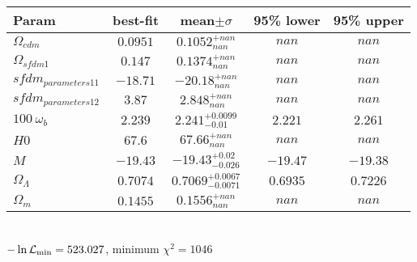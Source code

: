 \begin{tabular}{|l|c|c|c|c|} 
 \hline 
Param & best-fit & mean$\pm\sigma$ & 95\% lower & 95\% upper \\ \hline 
$\Omega_{cdm }$ &$0.0951$ & $0.1052_{nan}^{+nan}$ & $nan$ & $nan$ \\ 
$\Omega_{sfdm 1 }$ &$0.147$ & $0.1374_{nan}^{+nan}$ & $nan$ & $nan$ \\ 
$sfdm_{parameters 1  1 }$ &$-18.71$ & $-20.18_{nan}^{+nan}$ & $nan$ & $nan$ \\ 
$sfdm_{parameters 1  2 }$ &$3.87$ & $2.848_{nan}^{+nan}$ & $nan$ & $nan$ \\ 
$100~\omega_{b }$ &$2.239$ & $2.241_{-0.01}^{+0.0099}$ & $2.221$ & $2.261$ \\ 
$H0$ &$67.6$ & $67.66_{nan}^{+nan}$ & $nan$ & $nan$ \\ 
$M$ &$-19.43$ & $-19.43_{-0.026}^{+0.02}$ & $-19.47$ & $-19.38$ \\ 
$\Omega_{\Lambda }$ &$0.7074$ & $0.7069_{-0.0071}^{+0.0067}$ & $0.6935$ & $0.7226$ \\ 
$\Omega_{m }$ &$0.1455$ & $0.1556_{nan}^{+nan}$ & $nan$ & $nan$ \\ 
\hline 
 \end{tabular} \\ 
$-\ln{\cal L}_\mathrm{min} =523.027$, minimum $\chi^2=1046$ \\ 
